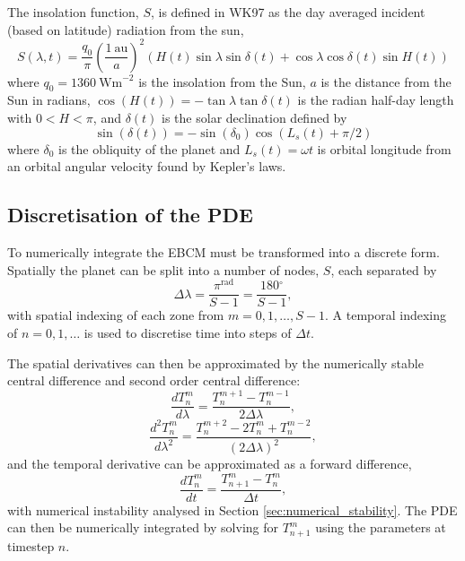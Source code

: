 \documentclass[12pt, onecolumn]{revtex4-2}    %
\newcommand{\radians}{\ensuremath{^{\text{rad}}}}
\newcommand{\degrees}{\ensuremath{^{\circ}}}
\begin{document}
The insolation function, $S$, is defined in WK97 as the day averaged incident (based on latitude) radiation from the sun,
$$
    S(\lambda, t) = \frac{q_0}{\pi} \left(\frac{1 \ \text{au}}{a}\right)^2 (H(t) \sin{\lambda} \sin{\delta(t)} + \cos{\lambda} \cos{\delta(t)} \sin{H(t)})
$$
where $q_0=1360 \ \text{Wm}^{-2}$ is the insolation from the Sun,
$a$ is the distance from the Sun in radians,
$\cos(H(t)) = -\tan\lambda \tan \delta(t)$ is the radian half-day length with $0 < H < \pi$,
and $\delta(t)$ is the solar declination defined by
$$
    \sin(\delta(t)) = -\sin(\delta_0) \cos(L_s(t) + \pi/2)
$$
where $\delta_0$ is the obliquity of the planet and $L_s(t) = \omega t$ is orbital longitude from an orbital angular velocity found by Kepler's laws.

\subsection{Discretisation of the PDE} \label{ssec:solve_PDE}

To numerically integrate the EBCM must be transformed into a discrete form. Spatially the planet can be split into a number of nodes, $S$, each separated by
\begin{equation*}
    \Delta\lambda = \frac{\pi\radians}{S - 1} = \frac{180\degrees}{S - 1},
\end{equation*}
with spatial indexing of each zone from $m=0, 1, \dots, S-1$.
A temporal indexing of $n=0,1,\dots$ is used to discretise time into steps of $\Delta t$.

The spatial derivatives can then be approximated by the numerically stable central difference and second order central difference:
\begin{equation} \label{eq:space_1}
    \frac{dT^m_n}{d\lambda} = \frac{T^{m+1}_n - T^{m-1}_n}{2 \Delta\lambda},
\end{equation}
\begin{equation} \label{eq:space_2}
    \frac{d^2T^m_n}{d\lambda^2} = \frac{T^{m+2}_n -2T^m_n + T^{m-2}_n}{(2 \Delta\lambda)^2},
\end{equation}
and the temporal derivative can be approximated as a forward difference,
\begin{equation} \label{eq:time_1}
    \frac{dT^m_n}{dt} = \frac{T^m_{n+1} - T^m_n}{\Delta t},
\end{equation}
with numerical instability analysed in Section \ref{sec:numerical_stability}.
The PDE can then be numerically integrated by solving for $T^{m}_{n+1}$ using the parameters at timestep $n$.
\end{document}
